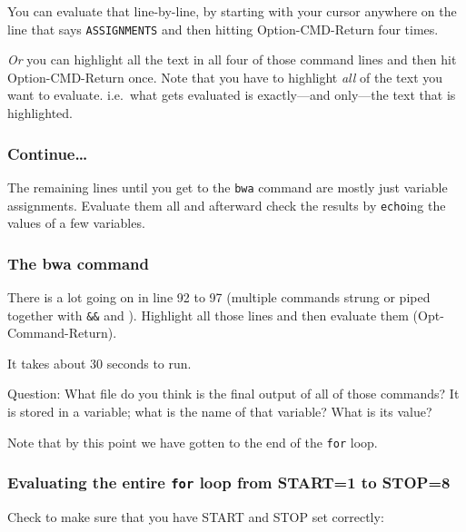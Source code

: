 \documentclass[]{krantz}
\makeatletter
\newenvironment{Shaded}{\begin{snugshade}}{\end{snugshade}}
\newcommand{\BuiltInTok}[1]{#1}
\newcommand{\VariableTok}[1]{\textcolor[rgb]{0,0,0}{#1}}
\newenvironment{kframe}{%
\medskip{}
\setlength{\fboxsep}{.8em}
 \def\at@end@of@kframe{}%
 \ifinner\ifhmode%
  \def\at@end@of@kframe{\end{minipage}}%
  \begin{minipage}{\columnwidth}%
 \fi\fi%
 \def\FrameCommand##1{\hskip\@totalleftmargin \hskip-\fboxsep
 \colorbox{shadecolor}{##1}\hskip-\fboxsep
     \hskip-\linewidth \hskip-\@totalleftmargin \hskip\columnwidth}%
 \MakeFramed {\advance\hsize-\width
   \@totalleftmargin\z@ \linewidth\hsize
   \@setminipage}}%
 {\par\unskip\endMakeFramed%
 \at@end@of@kframe}
\renewenvironment{Shaded}{\begin{kframe}}{\end{kframe}}
\makeatother
\begin{document}
You can evaluate that line-by-line, by starting with your cursor
anywhere on the line that says \texttt{ASSIGNMENTS} and then hitting
Option-CMD-Return four times.

\emph{Or} you can highlight all the text in all four of those command lines
and then hit Option-CMD-Return once. Note that you have to highlight
\emph{all} of the text you want to evaluate. i.e.~what gets evaluated is exactly---and
only---the text that is highlighted.

\hypertarget{continue}{%
\subsubsection{Continue\ldots{}}\label{continue}}

The remaining lines until you get to the \texttt{bwa} command are mostly
just variable assignments. Evaluate them all and afterward
check the results by \texttt{echo}ing the values of a few variables.

\hypertarget{the-bwa-command}{%
\subsubsection{The bwa command}\label{the-bwa-command}}

There is a lot going on in line 92 to 97 (multiple commands strung or piped
together with \texttt{\&\&} and \texttt{\textbar{}}). Highlight all those lines and then evaluate them
(Opt-Command-Return).

It takes about 30 seconds to run.

Question: What file do you think is the final output of all of those commands?
It is stored in a variable; what is the name of that variable? What is its value?

Note that by this point we have gotten to the end of the
\texttt{for} loop.

\hypertarget{evaluating-the-entire-for-loop-from-start1-to-stop8}{%
\subsubsection{\texorpdfstring{Evaluating the entire \texttt{for} loop from START=1 to STOP=8}{Evaluating the entire for loop from START=1 to STOP=8}}\label{evaluating-the-entire-for-loop-from-start1-to-stop8}}

Check to make sure that you have START and STOP set correctly:

\begin{Shaded}
\end{Shaded}
\end{document}

